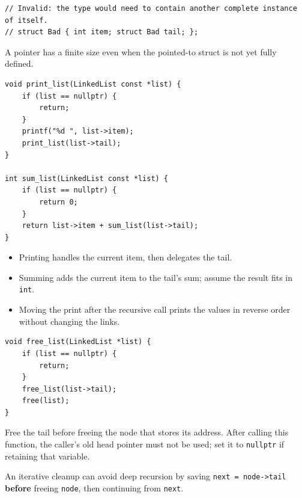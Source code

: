 \documentclass[11pt,a4paper]{article}
\providecommand{\tightlist}{\setlength{\itemsep}{0pt}\setlength{\parskip}{0pt}}
\begin{document}
\begin{lstlisting}[style=cscode]
// Invalid: the type would need to contain another complete instance of itself.
// struct Bad { int item; struct Bad tail; };
\end{lstlisting}

A pointer has a finite size even when the pointed-to struct is not yet fully defined.

\label{print-and-sum}
\hypertarget{print-and-sum}{}

\begin{lstlisting}[style=cscode]
void print_list(LinkedList const *list) {
    if (list == nullptr) {
        return;
    }
    printf("%d ", list->item);
    print_list(list->tail);
}

int sum_list(LinkedList const *list) {
    if (list == nullptr) {
        return 0;
    }
    return list->item + sum_list(list->tail);
}
\end{lstlisting}

\begin{itemize}
\tightlist
\item
  Printing handles the current item, then delegates the tail.
\item
  Summing adds the current item to the tail's sum; assume the result fits in \texttt{int}.
\item
  Moving the print after the recursive call prints the values in reverse order without changing the links.
\end{itemize}

\label{freeing-a-list}
\hypertarget{freeing-a-list}{}

\begin{lstlisting}[style=cscode]
void free_list(LinkedList *list) {
    if (list == nullptr) {
        return;
    }
    free_list(list->tail);
    free(list);
}
\end{lstlisting}

Free the tail before freeing the node that stores its address. After calling this function, the caller's old head pointer must not be used; set it to \texttt{nullptr} if retaining that variable.

An iterative cleanup can avoid deep recursion by saving \texttt{next\ =\ node-\textgreater{}tail} \textbf{before} freeing \texttt{node}, then continuing from \texttt{next}.

\label{reversing-a-list}
\hypertarget{reversing-a-list}{}
\end{document}

